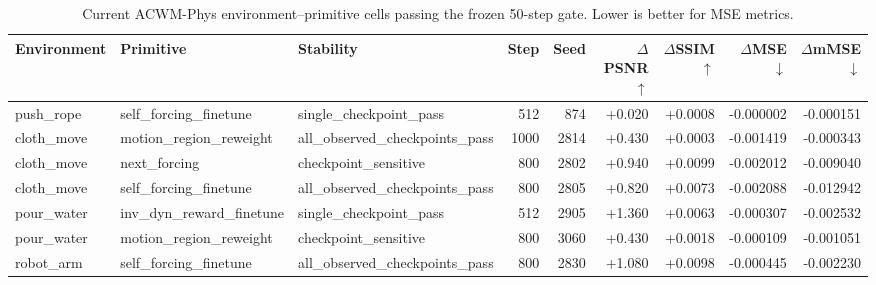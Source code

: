 \begin{table}[t]
\centering
\small
\caption{Current ACWM-Phys environment--primitive cells passing the frozen 50-step gate. Lower is better for MSE metrics.}
\label{tab:acwm_positive_cells}
\begin{tabular}{lllr rrrrr}
\toprule
Environment & Primitive & Stability & Step & Seed & $\Delta$PSNR$\uparrow$ & $\Delta$SSIM$\uparrow$ & $\Delta$MSE$\downarrow$ & $\Delta$mMSE$\downarrow$ \\
\midrule
push\_rope & self\_forcing\_finetune & single\_checkpoint\_pass & 512 & 874 & +0.020 & +0.0008 & -0.000002 & -0.000151 \\
cloth\_move & motion\_region\_reweight & all\_observed\_checkpoints\_pass & 1000 & 2814 & +0.430 & +0.0003 & -0.001419 & -0.000343 \\
cloth\_move & next\_forcing & checkpoint\_sensitive & 800 & 2802 & +0.940 & +0.0099 & -0.002012 & -0.009040 \\
cloth\_move & self\_forcing\_finetune & all\_observed\_checkpoints\_pass & 800 & 2805 & +0.820 & +0.0073 & -0.002088 & -0.012942 \\
pour\_water & inv\_dyn\_reward\_finetune & single\_checkpoint\_pass & 512 & 2905 & +1.360 & +0.0063 & -0.000307 & -0.002532 \\
pour\_water & motion\_region\_reweight & checkpoint\_sensitive & 800 & 3060 & +0.430 & +0.0018 & -0.000109 & -0.001051 \\
robot\_arm & self\_forcing\_finetune & all\_observed\_checkpoints\_pass & 800 & 2830 & +1.080 & +0.0098 & -0.000445 & -0.002230 \\
\bottomrule
\end{tabular}
\end{table}
